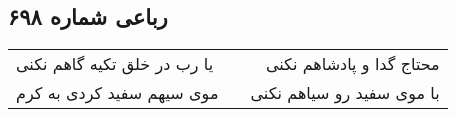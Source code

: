 \begin{center}
\section*{رباعی شماره ۶۹۸}
\label{sec:sh698}
\begin{longtable}{l p{0.5cm} r}
یا رب در خلق تکیه گاهم نکنی
&&
محتاج گدا و پادشاهم نکنی
\\
موی سیهم سفید کردی به کرم
&&
با موی سفید رو سیاهم نکنی
\\
\end{longtable}
\end{center}
